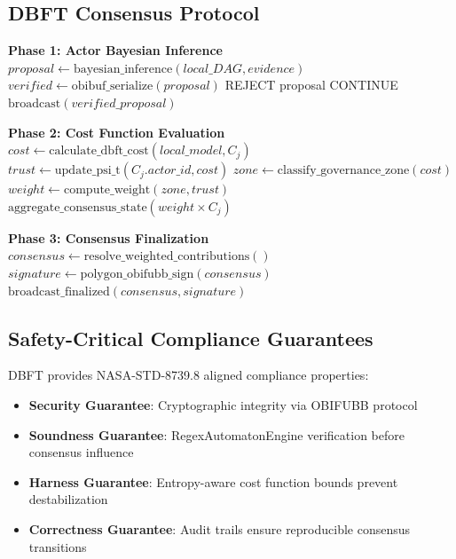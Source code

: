 \documentclass[12pt,a4paper]{article}
\begin{document}
\subsection{DBFT Consensus Protocol}

\begin{algorithm}
\caption{DBFT Consensus Protocol}
\begin{algorithmic}[1]
    \State \textbf{Phase 1: Actor Bayesian Inference}
        \State $proposal \gets \text{bayesian\_inference}(local\_DAG, evidence)$
        \State $verified \gets \text{obibuf\_serialize}(proposal)$
            \State \textsc{REJECT} proposal
            \State \textsc{CONTINUE}
        \EndIf
        \State $\text{broadcast}(verified\_proposal)$
    \EndFor
    
    \State \textbf{Phase 2: Cost Function Evaluation}
        \State $cost \gets \text{calculate\_dbft\_cost}(local\_model, C_j)$
        \State $trust \gets \text{update\_psi\_t}(C_j.actor\_id, cost)$
        \State $zone \gets \text{classify\_governance\_zone}(cost)$
        \State $weight \gets \text{compute\_weight}(zone, trust)$
        \State $\text{aggregate\_consensus\_state}(weight \times C_j)$
    \EndFor
    
    \State \textbf{Phase 3: Consensus Finalization}
    \State $consensus \gets \text{resolve\_weighted\_contributions}()$
    \State $signature \gets \text{polygon\_obifubb\_sign}(consensus)$
    \State $\text{broadcast\_finalized}(consensus, signature)$
\EndFunction
\end{algorithmic}
\end{algorithm}

\subsection{Safety-Critical Compliance Guarantees}

DBFT provides NASA-STD-8739.8 aligned compliance properties:

\begin{itemize}
    \item \textbf{Security Guarantee}: Cryptographic integrity via OBIFUBB protocol
    \item \textbf{Soundness Guarantee}: RegexAutomatonEngine verification before consensus influence
    \item \textbf{Harness Guarantee}: Entropy-aware cost function bounds prevent destabilization
    \item \textbf{Correctness Guarantee}: Audit trails ensure reproducible consensus transitions
\end{itemize}
\end{document}
